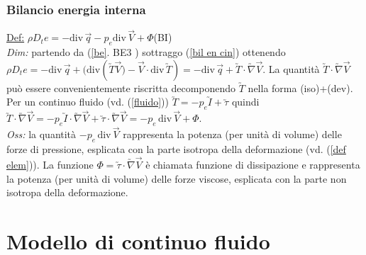 \documentclass[11pt,a4paper]{report}
\newcommand{\sz}[1]{\scriptsize #1\normalsize}
\begin{document}
		\subsection{Bilancio energia interna}
		\underline{Def:} $\rho D_te=-\mathrm{div}\,\vec q-p_e\mathrm{div}\,\vec V+\Phi$\quad\sz{(BI) }\\
		\textit{Dim:} partendo da (\ref{be}.\sz{ BE3 }) sottraggo (\ref{bil en cin}) ottenendo $\rho D_te=-\mathrm{div}\,\vec q+\big(\mathrm{div}(\utilde T\vec V\big)-\vec V\cdot\mathrm{div}\,\utilde T)=-\mathrm{div}\,\vec q+\utilde T\cdot\utilde\nabla\vec V$. La quantità $\utilde T\cdot\utilde\nabla\vec V$ può essere convenientemente riscritta decomponendo $\utilde T$ nella forma (iso)+(dev). Per un continuo fluido \big(vd. (\ref{fluido})\big) $\utilde T=-p_e\utilde I+\utilde\tau$ quindi $\utilde T\cdot\utilde\nabla\vec V=-p_e\utilde I\cdot\utilde\nabla\vec V+\utilde\tau\cdot\utilde\nabla\vec V=-p_e\,\mathrm{div}\,\vec V+\Phi$.\\
		\textit{Oss:} la quantità $-p_e\,\mathrm{div}\,\vec V$ rappresenta la potenza (per unità di volume) delle forze di pressione, esplicata con la parte isotropa della deformazione \big(vd. (\ref{def elem})\big). La funzione $\Phi=\utilde\tau\cdot\utilde\nabla\vec V$ è chiamata funzione di dissipazione e rappresenta la potenza (per unità di volume) delle forze viscose, esplicata con la parte non isotropa della deformazione.

 
\chapter{Modello di continuo fluido}
\end{document}
